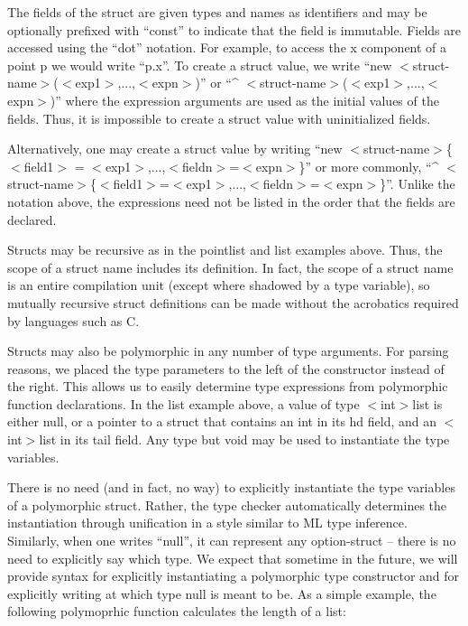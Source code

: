 \documentclass[titlepage,10pt]{article}
\begin{document}
The fields of the struct are given types and names as identifiers and
may be optionally prefixed with ``const'' to indicate that the field is
immutable.  Fields are accessed using the ``dot'' notation.  For
example, to access the x component of a point  p we would write ``p.x''.
To create a struct value, we write ``new
$<$struct-name$>$($<$exp1$>$,...,$<$expn$>$)'' or ``\^{}
$<$struct-name$>$($<$exp1$>$,...,$<$expn$>$)'' where the expression
arguments are used as the initial values of the fields.  Thus, it is
impossible to create a struct value with uninitialized fields.

Alternatively, one may create a struct value by writing ``new
$<$struct-name$>$\{$<$field1$>$ =
$<$exp1$>$,...,$<$fieldn$>$=$<$expn$>$\}'' or more commonly, ``\^{}
$<$struct-name$>$\{$<$field1$>$=$<$exp1$>$,...,$<$fieldn$>$=$<$expn$>$\}''.
Unlike the notation above, the expressions need not be listed in the
order that the fields are declared.

Structs may be recursive as in the pointlist and list examples above.
Thus, the scope of a struct name includes its definition.  In fact, the
scope of a struct name is an entire compilation unit (except where
shadowed by a type variable), so mutually recursive struct definitions
can be made without the acrobatics required by languages such as C.

Structs may also be polymorphic in any number of type arguments.  For
parsing reasons, we placed the type parameters to the left of the
constructor instead of the right.  This allows us to easily determine
type expressions from polymorphic function declarations.  In the list
example above, a value of type $<$int$>$list is either null, or a pointer to
a struct that contains an int in its hd field, and an $<$int$>$list in its
tail field.  Any type but void may be used to instantiate the type
variables.

There is no need (and in fact, no way) to explicitly instantiate the
type variables of a polymorphic struct.  Rather, the type checker
automatically determines the instantiation through unification in a
style similar to ML type inference.  Similarly, when one writes
``null'', it can represent any option-struct -- there is no need to
explicitly say which type.  We expect that sometime in the future, we
will provide syntax for explicitly instantiating a polymorphic type
constructor and for explicitly writing at which type null is meant to
be.  As a simple example, the following polymoprhic function calculates
the length of a list:
\end{document}
